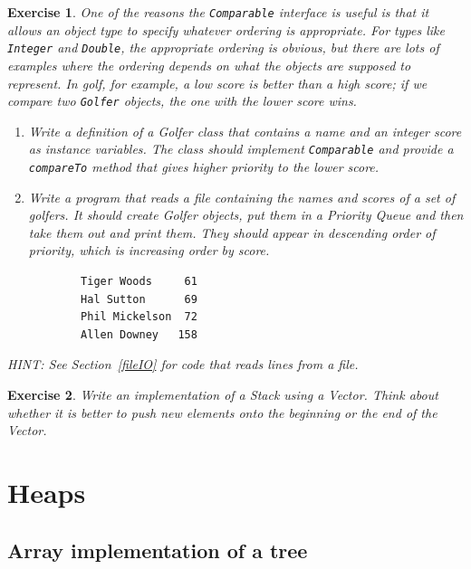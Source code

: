 \documentclass[12pt]{book}
\theoremstyle{exercise}
\newtheorem{exercise}{Exercise}[chapter]
\begin{document}
\begin{exercise}
One of the reasons the {\tt Comparable} interface is useful is
that it allows an object type to specify whatever ordering is
appropriate.
For types like {\tt Integer} and {\tt Double}, the
appropriate 
ordering is obvious, but there are lots of examples where the
ordering depends on what the objects are supposed
to represent.  In golf, for example, a low score is better than
a high score; if we compare two {\tt Golfer} objects,
the one with the lower score wins.

\begin{enumerate}

\item Write a definition of a Golfer class that contains a
name and an integer score as instance variables.  The class
should implement {\tt Comparable} and provide a {\tt compareTo}
method that gives higher priority to the lower score.

\item Write a program that reads a file containing the names
and scores of a set of golfers.  It should create Golfer objects,
put them in a Priority Queue and then take them out and print them.
They should appear in descending order of priority, which is
increasing order by score.

\begin{verbatim}
        Tiger Woods     61
        Hal Sutton      69
        Phil Mickelson  72
        Allen Downey   158
\end{verbatim}

\end{enumerate}

HINT: See Section~\ref{fileIO} for code that reads lines
from a file.
\end {exercise}


\begin{exercise}
Write an implementation of a Stack using a Vector.  Think about
whether it is better to push new elements onto the beginning or
the end of the Vector.
\end{exercise}





\chapter{Heaps}

\section{Array implementation of a tree}
\end{document}
